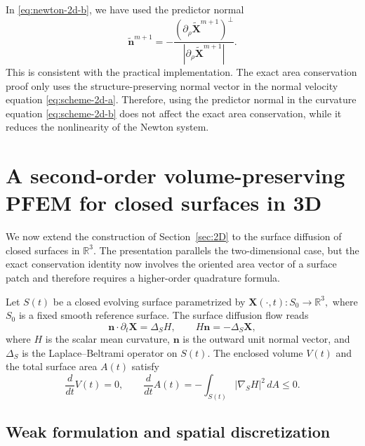 \documentclass[smallextended]{svjour3}
\numberwithin{equation}{section}
\begin{document}
	\begin{remark}
		In \eqref{eq:newton-2d-b}, we have used the predictor normal
		\[
		\widetilde{\mathbf{n}}^{m+1}
		=
		-\frac{(\partial_\rho\widetilde{\mathbf{X}}^{m+1})^\perp}
		{|\partial_\rho\widetilde{\mathbf{X}}^{m+1}|}.
		\]
		This is consistent with the practical implementation. The exact area conservation proof only uses the structure-preserving normal vector in the normal velocity equation \eqref{eq:scheme-2d-a}. Therefore, using the predictor normal in the curvature equation \eqref{eq:scheme-2d-b} does not affect the exact area conservation, while it reduces the nonlinearity of the Newton system.
	\end{remark}
	
\section{A second-order volume-preserving PFEM for closed surfaces in 3D}
\label{sec:3D}

We now extend the construction of Section~\ref{sec:2D} to the surface diffusion of closed surfaces in $\mathbb{R}^3$. The presentation parallels the two-dimensional case, but the exact conservation identity now involves the oriented area vector of a surface patch and therefore requires a higher-order quadrature formula.

Let $S(t)$ be a closed evolving surface parametrized by
$
\mathbf{X}(\cdot,t):S_0\to\mathbb{R}^3,
$
where $S_0$ is a fixed smooth reference surface. The surface diffusion flow reads
\begin{equation}
	\mathbf{n}\cdot\partial_t\mathbf{X}=\Delta_S H,
	\qquad
	H\mathbf{n}=-\Delta_S\mathbf{X},
	\label{eq:strong-3d}
\end{equation}
where $H$ is the scalar mean curvature, $\mathbf{n}$ is the outward unit normal vector, and $\Delta_S$ is the Laplace--Beltrami operator on $S(t)$. The enclosed volume $V(t)$ and the total surface area $A(t)$ satisfy
\[
\frac{d}{dt}V(t)=0,\qquad
\frac{d}{dt}A(t)=-\int_{S(t)}|\nabla_S H|^2\,dA\le 0.
\]

\subsection{Weak formulation and spatial discretization}
\end{document}
